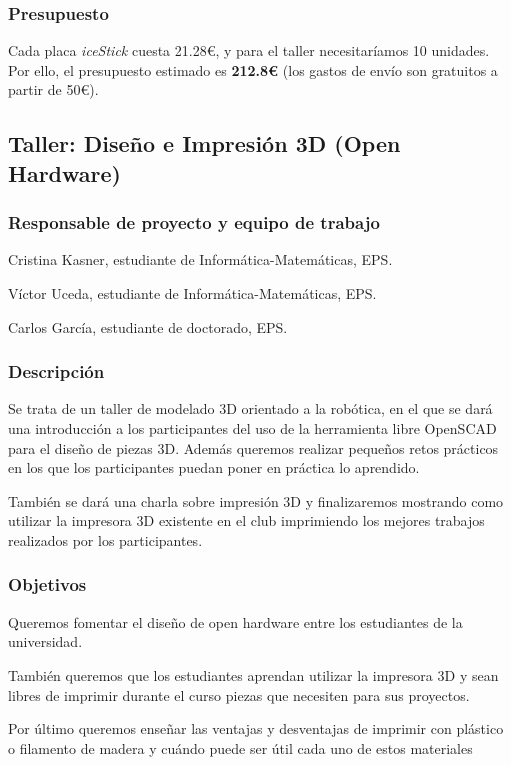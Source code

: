 \documentclass[12pt,twoside]{report}
\begin{document}
\subsubsection{Presupuesto}

Cada placa \emph{iceStick} cuesta 21.28\euro{}, y para el taller necesitaríamos 10 unidades. Por ello, el presupuesto estimado es \textbf{212.8\euro{}} (los gastos de envío son gratuitos a partir de 50\euro{}).






\subsection{Taller: Diseño e Impresión 3D (Open Hardware)}
\subsubsection{Responsable de proyecto y equipo de trabajo}
\item Cristina Kasner, estudiante de Informática-Matemáticas, EPS.
\item Víctor Uceda, estudiante de Informática-Matemáticas, EPS.
\item Carlos García, estudiante de doctorado, EPS.
\subsubsection{Descripción}
Se trata de un taller de modelado 3D orientado a la robótica, en el que se dará una introducción a los participantes del uso de la herramienta libre OpenSCAD para el diseño de piezas 3D. Además queremos realizar pequeños retos prácticos en los que los participantes puedan poner en práctica lo aprendido.

También se dará una charla sobre impresión 3D y finalizaremos mostrando como utilizar la impresora 3D existente en el club imprimiendo los mejores trabajos realizados por los participantes.
\subsubsection{Objetivos}
Queremos fomentar el diseño de open hardware entre los estudiantes de la universidad.

También queremos que los estudiantes aprendan utilizar la impresora 3D y sean libres de imprimir durante el curso piezas que necesiten para sus proyectos.

Por último queremos enseñar las ventajas y desventajas de imprimir con plástico o filamento de madera y cuándo puede ser útil cada uno de estos materiales
\end{document}
